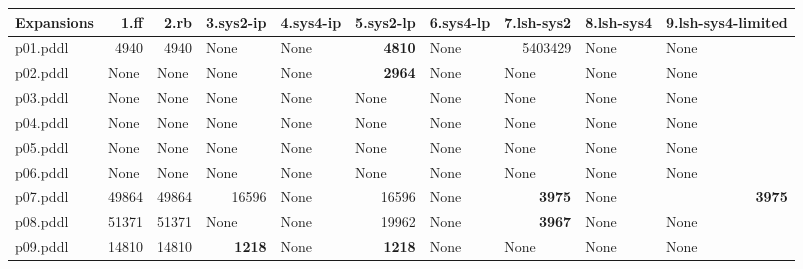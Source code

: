 \documentclass{article}
\begin{document}
\begin{tabular}{@{}lrrrrrrrrr@{}}
Expansions & 1.ff & 2.rb & 3.sys2-ip & 4.sys4-ip & 5.sys2-lp & 6.sys4-lp & 7.lsh-sys2 & 8.lsh-sys4 & 9.lsh-sys4-limited \\
\midrule
p01.pddl & 4940 & 4940 & \multicolumn{1}{|l|}{None} & \multicolumn{1}{|l|}{None} & \textbf{4810} & \multicolumn{1}{|l|}{None} & 5403429 & \multicolumn{1}{|l|}{None} & \multicolumn{1}{|l|}{None} \\
p02.pddl & \multicolumn{1}{|l|}{None} & \multicolumn{1}{|l|}{None} & \multicolumn{1}{|l|}{None} & \multicolumn{1}{|l|}{None} & \textbf{2964} & \multicolumn{1}{|l|}{None} & \multicolumn{1}{|l|}{None} & \multicolumn{1}{|l|}{None} & \multicolumn{1}{|l|}{None} \\
p03.pddl & \multicolumn{1}{|l|}{None} & \multicolumn{1}{|l|}{None} & \multicolumn{1}{|l|}{None} & \multicolumn{1}{|l|}{None} & \multicolumn{1}{|l|}{None} & \multicolumn{1}{|l|}{None} & \multicolumn{1}{|l|}{None} & \multicolumn{1}{|l|}{None} & \multicolumn{1}{|l|}{None} \\
p04.pddl & \multicolumn{1}{|l|}{None} & \multicolumn{1}{|l|}{None} & \multicolumn{1}{|l|}{None} & \multicolumn{1}{|l|}{None} & \multicolumn{1}{|l|}{None} & \multicolumn{1}{|l|}{None} & \multicolumn{1}{|l|}{None} & \multicolumn{1}{|l|}{None} & \multicolumn{1}{|l|}{None} \\
p05.pddl & \multicolumn{1}{|l|}{None} & \multicolumn{1}{|l|}{None} & \multicolumn{1}{|l|}{None} & \multicolumn{1}{|l|}{None} & \multicolumn{1}{|l|}{None} & \multicolumn{1}{|l|}{None} & \multicolumn{1}{|l|}{None} & \multicolumn{1}{|l|}{None} & \multicolumn{1}{|l|}{None} \\
p06.pddl & \multicolumn{1}{|l|}{None} & \multicolumn{1}{|l|}{None} & \multicolumn{1}{|l|}{None} & \multicolumn{1}{|l|}{None} & \multicolumn{1}{|l|}{None} & \multicolumn{1}{|l|}{None} & \multicolumn{1}{|l|}{None} & \multicolumn{1}{|l|}{None} & \multicolumn{1}{|l|}{None} \\
p07.pddl & 49864 & 49864 & 16596 & \multicolumn{1}{|l|}{None} & 16596 & \multicolumn{1}{|l|}{None} & \textbf{3975} & \multicolumn{1}{|l|}{None} & \textbf{3975} \\
p08.pddl & 51371 & 51371 & \multicolumn{1}{|l|}{None} & \multicolumn{1}{|l|}{None} & 19962 & \multicolumn{1}{|l|}{None} & \textbf{3967} & \multicolumn{1}{|l|}{None} & \multicolumn{1}{|l|}{None} \\
p09.pddl & 14810 & 14810 & \textbf{1218} & \multicolumn{1}{|l|}{None} & \textbf{1218} & \multicolumn{1}{|l|}{None} & \multicolumn{1}{|l|}{None} & \multicolumn{1}{|l|}{None} & \multicolumn{1}{|l|}{None} \\

\end{tabular}
\end{document}
